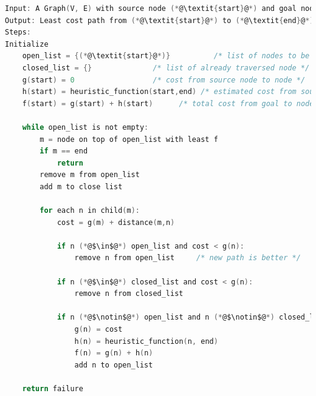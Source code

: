 \documentclass[a4paper]{article}
\begin{document}
\begin{lstlisting}[language=C , caption=A*~\cite{A*},label={algo:a_star} ]
Input: A Graph(V, E) with source node (*@\textit{start}@*) and goal node (*@\textit{end}@*).
Output: Least cost path from (*@\textit{start}@*) to (*@\textit{end}@*).
Steps:
Initialize 
    open_list = {(*@\textit{start}@*)}          /* list of nodes to be traversed */
    closed_list = {}              /* list of already traversed node */
    g(start) = 0                  /* cost from source node to node */
    h(start) = heuristic_function(start,end) /* estimated cost from source to goal node */
    f(start) = g(start) + h(start)      /* total cost from goal to node */
    
    while open_list is not empty:
        m = node on top of open_list with least f
        if m == end
            return
        remove m from open_list
        add m to close list
        
        for each n in child(m):
            cost = g(m) + distance(m,n)
            
            if n (*@$\in$@*) open_list and cost < g(n):
                remove n from open_list     /* new path is better */
                
            if n (*@$\in$@*) closed_list and cost < g(n):
                remove n from closed_list
                
            if n (*@$\notin$@*) open_list and n (*@$\notin$@*) closed_list:
                g(n) = cost
                h(n) = heuristic_function(n, end)
                f(n) = g(n) + h(n)
                add n to open_list
    
    return failure
    
\end{lstlisting}
\end{document}
